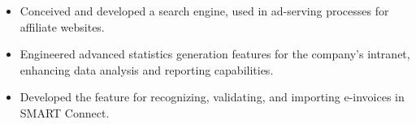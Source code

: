 \begin{minipage}{\linewidth}
\begin{itemize}
  \item Conceived and developed a search engine, used in ad-serving processes for affiliate websites. 
  \item Engineered advanced statistics generation features for the company’s intranet, enhancing data analysis and reporting capabilities.
  \item Developed the feature for recognizing, validating, and importing e-invoices in SMART Connect.
\end{itemize}
\end{minipage}
\divider
